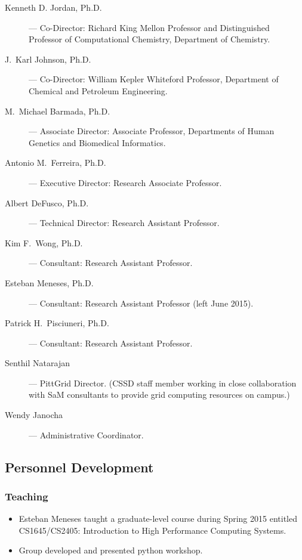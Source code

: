 \begin{description}

    \item [Kenneth D. Jordan, Ph.D.] --- Co-Director: Richard King Mellon
	  Professor and Distinguished Professor of Computational Chemistry,
          Department of Chemistry.

    \item [J.\ Karl Johnson, Ph.D.] --- Co-Director: William Kepler Whiteford
          Professor, Department of Chemical and Petroleum Engineering.

    \item [M.\ Michael Barmada, Ph.D.] --- Associate Director: Associate
	  Professor, Departments of Human Genetics and Biomedical Informatics.

    \item [Antonio M.\ Ferreira, Ph.D.] --- Executive Director: Research Associate Professor.
          

    \item [Albert DeFusco, Ph.D.] --- Technical Director: Research Assistant Professor.

    \item [Kim F.\ Wong, Ph.D.] --- Consultant: Research Assistant Professor.

    \item [Esteban Meneses, Ph.D.] --- Consultant: Research Assistant Professor (left June 2015).

    \item [Patrick H.\ Pisciuneri, Ph.D.] --- Consultant: Research Assistant Professor.

    \item [Senthil Natarajan] --- PittGrid Director. (CSSD staff
          member working in close collaboration with SaM consultants to
          provide grid computing resources on campus.)

    \item [Wendy Janocha] --- Administrative Coordinator.

\end{description}


\subsection{Personnel Development}
\subsubsection{Teaching}
\begin{itemize}
    \item Esteban Meneses taught a graduate-level course during Spring 2015 entitled CS1645/CS2405: Introduction to High Performance Computing Systems.

    \item Group developed and presented python workshop.
\end{itemize}



